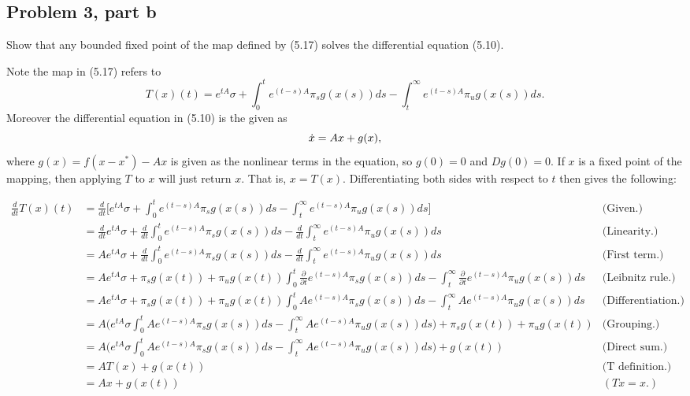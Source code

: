 \newpage
\subsection{Problem 3, part b}
Show that any bounded fixed point of the map defined by (5.17) solves the differential equation (5.10).
\partbreak
\begin{solution}

Note the map in (5.17) refers to 
\[
T(x)(t) = e^{tA}\sigma + \int_0^t e^{(t - s)A}\pi_sg(x(s))ds - \int_t^\infty e^{(t - s)A}\pi_ug(x(s))ds.
\]
Moreover the differential equation in (5.10) is the given as
\[
\dot{x} = Ax + g(x),
\]
where $g(x) = f(x - x^*) - Ax$ is given as the nonlinear terms in the equation, so $g(0) = 0$ and $Dg(0) = 0$. If $x$ is a fixed point of the mapping, then applying $T$ to $x$ will just return $x$. That is, $x = T(x)$. Differentiating both sides with respect to $t$ then gives the following:

\alignbreak
{\footnotesize
\begin{align*}
    \frac{d}{dt}T(x)(t) &= \frac{d}{dt}\Bigg[ e^{tA}\sigma + \int_0^t e^{(t - s)A}\pi_sg(x(s))ds - \int_t^\infty e^{(t - s)A}\pi_ug(x(s))ds\Bigg] &\text{(Given.)}\\
    &= \frac{d}{dt}e^{tA}\sigma + \frac{d}{dt}\int_0^t e^{(t - s)A}\pi_sg(x(s))ds - \frac{d}{dt}\int_t^\infty e^{(t - s)A}\pi_ug(x(s))ds &\text{(Linearity.)}\\
    &= Ae^{tA}\sigma + \frac{d}{dt}\int_0^t e^{(t - s)A}\pi_sg(x(s))ds - \frac{d}{dt}\int_t^\infty e^{(t - s)A}\pi_ug(x(s))ds &\text{(First term.)}\\
    &= Ae^{tA}\sigma + \pi_sg(x(t)) + \pi_ug(x(t))\int_0^t \frac{\partial}{\partial t}e^{(t - s)A}\pi_sg(x(s))ds - \int_t^\infty \frac{\partial}{\partial t}e^{(t - s)A}\pi_ug(x(s))ds &\text{(Leibnitz rule.)}\\
    &= Ae^{tA}\sigma + \pi_sg(x(t)) + \pi_ug(x(t))\int_0^t Ae^{(t - s)A}\pi_sg(x(s))ds - \int_t^\infty Ae^{(t - s)A}\pi_ug(x(s))ds &\text{(Differentiation.)}\\
    &= A\Bigg(e^{tA}\sigma \int_0^t Ae^{(t - s)A}\pi_sg(x(s))ds - \int_t^\infty Ae^{(t - s)A}\pi_ug(x(s))ds \Bigg) + \pi_sg(x(t)) + \pi_ug(x(t)) &\text{{(Grouping.)}}\\
    &=  A\Bigg(e^{tA}\sigma \int_0^t Ae^{(t - s)A}\pi_sg(x(s))ds - \int_t^\infty Ae^{(t - s)A}\pi_ug(x(s))ds \Bigg) + g(x(t)) &\text{(Direct sum.)}\\
    &= AT(x) + g(x(t)) &\text{(T definition.)}\\
    &= Ax + g(x(t)) &(Tx = x.)
\end{align*}
\alignbreak
}
\end{solution}


